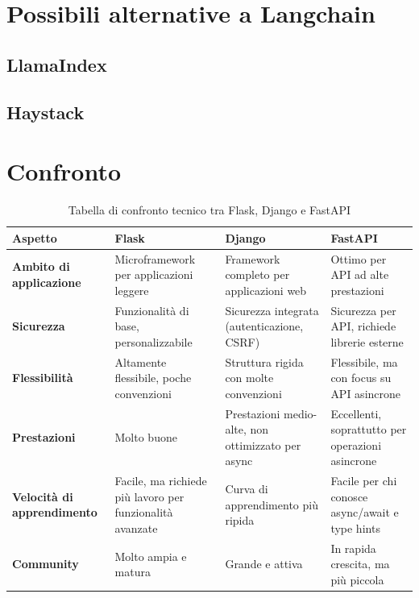 \documentclass{article}
\begin{document}
\section{Possibili alternative a Langchain}
\subsection{LlamaIndex}

\subsection{Haystack}



\section{Confronto}

\begin{table}[H]
    \renewcommand{\arraystretch}{1.7}
    \centering
    \begin{tabular}{|p{2.55cm}|p{4cm}|p{4cm}|p{4cm}|}
        \hline
        \textbf{Aspetto} & \textbf{\large Flask} & \textbf{\large Django} & \textbf{\large FastAPI} \\
        \hline
        \textbf{Ambito di applicazione} & Microframework per applicazioni leggere & Framework completo per applicazioni web & Ottimo per API ad alte prestazioni \\
        \hline
        \textbf{Sicurezza} & Funzionalità di base, personalizzabile & Sicurezza integrata (autenticazione, CSRF) & Sicurezza per API, richiede librerie esterne \\
        \hline
        \textbf{Flessibilità} & Altamente flessibile, poche convenzioni & Struttura rigida con molte convenzioni & Flessibile, ma con focus su API asincrone \\
        \hline
        \textbf{Prestazioni} & Molto buone & Prestazioni medio-alte, non ottimizzato per async & Eccellenti, soprattutto per operazioni asincrone \\
        \hline
        \textbf{Velocità di apprendimento} & Facile, ma richiede più lavoro per funzionalità avanzate & Curva di apprendimento più ripida & Facile per chi conosce async/await e type hints \\
        \hline
        \textbf{Community} & Molto ampia e matura & Grande e attiva & In rapida crescita, ma più piccola \\
        \hline
    \end{tabular}
    \caption{Tabella di confronto tecnico tra Flask, Django e FastAPI}
\end{table}
\end{document}
